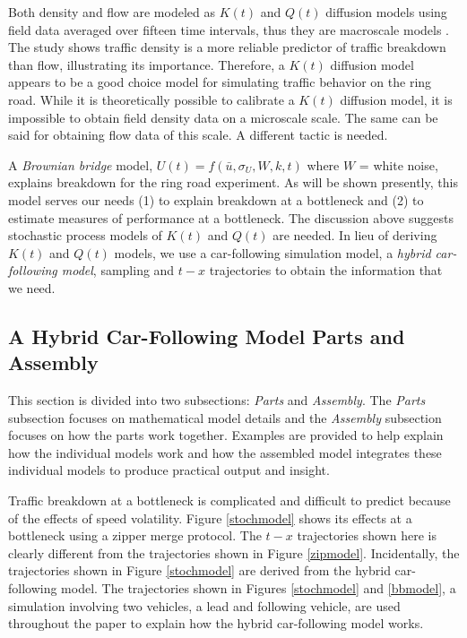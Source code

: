 \documentclass[Proceedings]{ascelike}
\begin{document}
Both density and flow are modeled as $K(t)$ and $Q(t)$ diffusion models using field data averaged over fifteen time intervals, thus they are macroscale models  \cite{pjo2017}. The study shows traffic density is a more reliable predictor of traffic breakdown than flow, illustrating its  importance. Therefore,  a $K(t)$ diffusion model appears to be a good choice model for simulating traffic behavior on the ring road.  While it is theoretically possible  to calibrate a $K(t)$ diffusion model, it is impossible to obtain field density data on a microscale scale. The same can be said for obtaining flow data of this scale. A different tactic is needed.

A \emph{Brownian bridge} model, $U(t) = f(\bar{u},\sigma_U,W,k,t)$ where $W$ = white noise, explains breakdown for the ring road experiment. As will be shown presently, this model  serves our needs (1) to explain breakdown at a bottleneck and (2) to estimate measures of performance at a bottleneck. The discussion above suggests stochastic process models of $K(t)$ and $Q(t)$ are needed. In lieu of deriving $K(t)$ and $Q(t)$ models, we use a car-following simulation model, a \emph{hybrid car-following model}, sampling and $t-x$ trajectories to obtain the information that we need. 

 
\subsection{A Hybrid Car-Following Model Parts and Assembly} 

This section is divided into two subsections: \emph{Parts} and \emph{Assembly}. The \emph{Parts} subsection focuses on mathematical model details and the \emph{Assembly} subsection focuses on how the parts work together. Examples are provided to help explain how the individual models work and how the assembled model integrates these individual models to produce practical output and insight. 

Traffic breakdown at a bottleneck is complicated and difficult to predict because of the effects of speed volatility. Figure \ref{stochmodel} shows its effects  at a bottleneck using a zipper merge protocol. The $t-x$ trajectories  shown here  is clearly different from the trajectories shown in Figure \ref{zipmodel}. Incidentally, the trajectories shown in Figure \ref{stochmodel} are derived from the hybrid car-following model. The trajectories shown in Figures \ref{stochmodel} and \ref{bbmodel}, a simulation involving two vehicles, a lead and following vehicle, are used throughout the paper to explain how the hybrid car-following model works.
\end{document}
